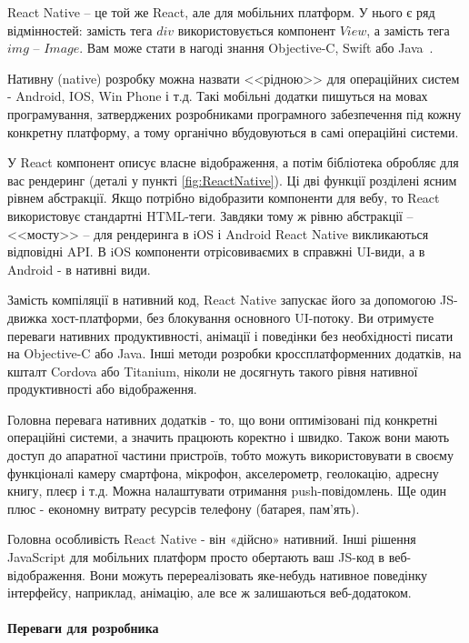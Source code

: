React Native -- це той же React, але для мобільних платформ. У нього є ряд відмінностей: замість тега $div$ використовується компонент $View$, а замість тега $img$ -- $Image$. Вам може стати в нагоді знання Objective-C, Swift або Java~\cite{9781787282537}. 

Нативну (native) розробку можна назвати <<рідною>> для операційних систем - Android, IOS, Win Phone і т.д. Такі мобільні додатки пишуться на мовах програмування, затверджених розробниками програмного забезпечення під кожну конкретну платформу, а тому органічно вбудовуються в самі операційні системи.

У React компонент описує власне відображення, а потім бібліотека обробляє для вас рендеринг (деталі у пункті \ref{fig:ReactNative}). Ці дві функції розділені ясним рівнем абстракції. Якщо потрібно відобразити компоненти для вебу, то React використовує стандартні HTML-теги. Завдяки тому ж рівню абстракції -- <<мосту>> -- для рендеринга в iOS і Android React Native викликаються відповідні API. В iOS компоненти отрісовиваємих в справжні UI-види, а в Android - в нативні види.

Замість компіляції в нативний код, React Native запускає його за допомогою JS-движка хост-платформи, без блокування основного UI-потоку. Ви отримуєте переваги нативних продуктивності, анімації і поведінки без необхідності писати на Objective-C або Java. Інші методи розробки кроссплатформенних додатків, на кшталт Cordova або Titanium, ніколи не досягнуть такого рівня нативної продуктивності або відображення.

Головна перевага нативних додатків - то, що вони оптимізовані під конкретні операційні системи, а значить працюють коректно і швидко. Також вони мають доступ до апаратної частини пристроїв, тобто можуть використовувати в своєму функціоналі камеру смартфона, мікрофон, акселерометр, геолокацію, адресну книгу, плеєр і т.д. Можна налаштувати отримання push-повідомлень. Ще один плюс - економну витрату ресурсів телефону (батарея, пам'ять).

Головна особливість React Native - він «дійсно» нативний. Інші рішення JavaScript для мобільних платформ просто обертають ваш JS-код в веб-відображення. Вони можуть перереалізовать яке-небудь нативное поведінку інтерфейсу, наприклад, анімацію, але все ж  залишаються веб-додатоком.

\paragraph{Переваги для розробника}

